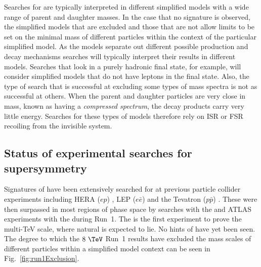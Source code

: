 Searches for \SUSY are typically interpreted in different simplified
models with a wide range of parent and daughter masses. In the case
that no \SUSY signature is observed, the simplified models that are
excluded and those that are not allow limits to be set on the minimal
mass of different \SUSY particles within the context of the particular
simplified model. As the models separate out different possible \SUSY
production and decay mechanisms searches will typically interpret
their results in different models. Searches that look in a purely
hadronic final state, for example, will consider simplified models
that do not have leptons in the final state. Also, the type of search
that is successful at excluding some types of mass spectra is not as
successful at others. When the parent and daughter particles are very
close in mass, known as having a \emph{compressed spectrum}, the \SM
decay products carry very little energy. Searches for these types of
models therefore rely on \acf{ISR} or \acf{FSR} recoiling from the
invisible \SUSY system.


\subsection{Status of experimental searches for supersymmetry}

Signatures of \SUSY have been extensively searched for at previous
particle collider experiments including HERA ($ep$)
\cite{Aid:1996es,Butterworth:1992tc}, LEP ($e\bar{e}$)
\cite{Braibant:2003px} and the Tevatron ($p\bar{p}$)
\cite{Jaffre:2012gx}. These were then surpassed in most regions of
phase space by searches with the \CMS and ATLAS experiments with the
\LHC during Run~1. The \LHC is the first experiment to prove the
multi-TeV scale, where natural \SUSY is expected to lie. No hints of
\SUSY have yet been seen. The degree to which the $8~\tev$ Run~1
results have excluded the mass scales of different \SUSY particles
within a simplified model context can be seen in
Fig.~\ref{fig:run1Exclusion}.

